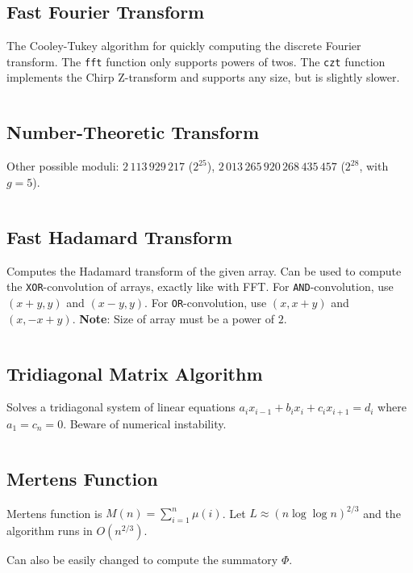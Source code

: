 \documentclass[8pt,a4paper,landscape,oneside]{amsart}
\newcommand{\code}[1]{\inputminted[fontsize=\normalsize,baselinestretch=1]{cpp}{_code/#1}}
\newif\ifverbose
\begin{document}
\begin{multicols*}{3}
    \subsection{Fast Fourier Transform}
        The Cooley-Tukey algorithm for quickly computing the discrete Fourier
        transform. The \texttt{fft} function only supports powers of twos. The
        \texttt{czt} function implements the Chirp Z-transform and supports any
        size, but is slightly slower.
        \code{mathematics/fft.cpp}
    \subsection{Number-Theoretic Transform}
        Other possible moduli: $2\,113\,929\,217$ ($2^{25}$), $2\,013\,265\,920\,268\,435\,457$ ($2^{28}$, with $g=5$). %
        \code{mathematics/ntt.cpp}

    \subsection{Fast Hadamard Transform}
        Computes the Hadamard transform of the given array. Can be used to
        compute the \texttt{XOR}-convolution of arrays, exactly like with FFT.
        For \texttt{AND}-convolution, use $(x+y,y)$ and $(x-y,y)$. For
        \texttt{OR}-convolution, use $(x,x+y)$ and $(x,-x+y)$. \textbf{Note}:
        Size of array must be a power of $2$.
        \code{mathematics/fht.cpp}

    \subsection{Tridiagonal Matrix Algorithm}
        Solves a tridiagonal system of linear equations $a_ix_{i-1} + b_ix_i +
        c_ix_{i+1} = d_i$ where $a_1 = c_n = 0$. Beware of numerical
        instability.
        \code{mathematics/tridiagonal.cpp}

    \subsection{Mertens Function}
        Mertens function is $M(n) = \sum_{i=1}^n \mu(i)$. Let $L\approx
        (n\log{\log{n}})^{2/3}$ and the algorithm runs in $O(n^{2/3})$.
        \ifverbose
        \else
            Can also be easily changed to compute the summatory $\Phi$.
        \fi
        \code{mathematics/mertens.cpp}
    \ifverbose
    \subsection{Summatory Phi}
        The summatory phi function $\Phi(n) = \sum_{i=1}^n \phi(i)$. Let $L\approx
        (n\log{\log{n}})^{2/3}$ and the algorithm runs in $O(n^{2/3})$.
        \code{mathematics/summatory_phi.cpp}
    \fi


\end{multicols*}
\end{document}
